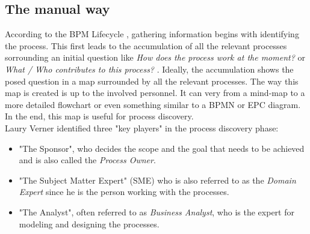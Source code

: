 \subsection{The manual way}
According to the BPM Lifecycle \cite{Dumas2013}, gathering information begins with identifying the process. This first leads to the accumulation of all the relevant processes sorrounding an initial question like \textit{How does the process work at the moment?} or \textit{What / Who contributes to this process?} \cite{Dumas2013}. Ideally, the accumulation shows the posed question in a map surrounded by all the relevant processes. The way this map is created is up to the involved personnel. It can very from a mind-map to a more detailed flowchart or even something similar to a BPMN or EPC diagram. In the end, this map is useful for process discovery. \\
Laury Verner identified three "key players" \cite{Verner2004} in the process discovery phase: 
\begin{itemize}
\item "The Sponsor", who decides the scope and the goal that needs to be achieved and is also called the \textit{Process Owner}.
\item "The Subject Matter Expert" (SME) who is also referred to as the \textit{Domain Expert} since he is the person working with the processes.
\item "The Analyst", often referred to as \textit{Business Analyst}, who is the expert for modeling and designing the processes. 
\end{itemize}


